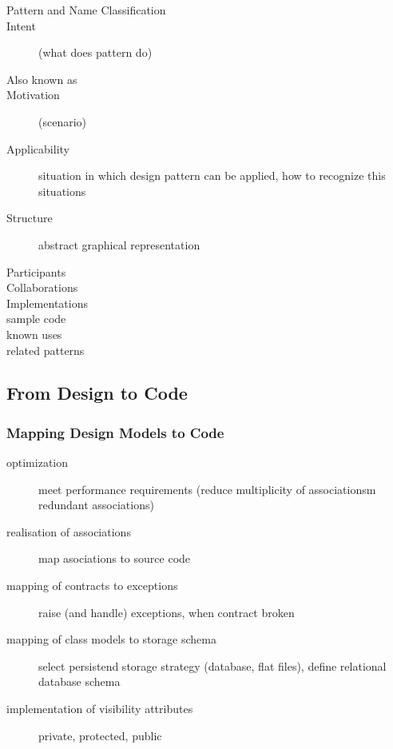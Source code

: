 \documentclass[a4paper, 10pt]{article}
\begin{document}
\begin{description}
	\item[Pattern and Name Classification]
	\item[Intent] (what does pattern do)
	\item[Also known as]
	\item[Motivation] (scenario)
	\item[Applicability] situation in which design pattern can be applied, how to recognize this situations
	\item[Structure] abstract graphical representation
	\item[Participants]
	\item[Collaborations]
	\item[Implementations]
	\item[sample code]
	\item[known uses]
	\item[related patterns]
\end{description}

\subsection*{From Design to Code}
\subsubsection*{Mapping Design Models to Code}
\begin{description}
	\item[optimization] meet performance requirements (reduce multiplicity of associationsm redundant associations)
	\item[realisation of associations] map asociations to source code
	\item[mapping of contracts to exceptions] raise (and handle) exceptions, when contract broken
	\item[mapping of class models to storage schema] select persistend storage strategy (database, flat files), define relational database schema
	\item[implementation of visibility attributes] private, protected, public
\end{description}
\end{document}

